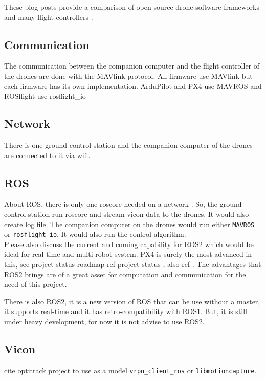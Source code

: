 These blog posts provide a comparison of open source drone software frameworks \cite{drone_software_projects} and many flight controllers \cite{drone_flight_controllers}.

\subsection{Communication}
The communication between the companion computer and the flight controller of the drones are done with the MAVlink protocol. All firmware use MAVlink but each firmware has its own implementation. ArduPilot and PX4 use MAVROS and ROSflight use rosflight\_io

\subsection{Network}
There is one ground control station and the companion computer of the drones are connected to it via wifi.

\subsection{ROS}
About ROS, there is only one roscore needed on a network \cite{stackoverflow_multi_machine}.
So, the ground control station run roscore and stream vicon data to the drones. It would also create log file.
The companion computer on the drones would run either \texttt{MAVROS} or \texttt{rosflight\_io}.
It would also run the control algorithm.
{\color{red} \\Please also discuss the current and coming capability for ROS2 which would be ideal for real-time and multi-robot system. PX4 is surely the most advanced in this, see project status roadmap ref project status \cite{px4}, also ref \cite{ros_wiki_ng_drones}. The advantages that ROS2 brings are of a great asset for computation and communication for the need of this project.\\}

There is also ROS2, it is a new version of ROS that can be use without a master, it supports real-time and it has retro-compatibility with ROS1. But, it is still under heavy development, for now it is not advise to use ROS2.

\subsection{Vicon}
{\color{red} cite optitrack project to use as a model}
\texttt{vrpn\_client\_ros} or \texttt{libmotioncapture}.

